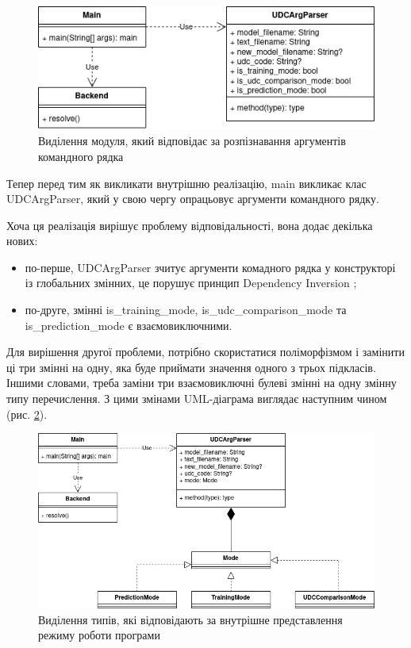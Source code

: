 \documentclass[14pt]{extarticle}
\begin{document}
  \begin{figure}[H]
    \centering
    \includegraphics{io_uml2.drawio.png}    
    \captionsetup{justification=centering}  
    \caption{Виділення модуля,
    який відповідає за розпізнавання аргументів командного рядка}
    \label{fig:io_uml2}
  \end{figure}

  Тепер перед тим як викликати внутрішню реалізацію,
  main викликає клас UDCArgParser,
  який у свою чергу опрацьовує аргументи командного рядку.
  
  Хоча ця реалізація вирішує проблему відповідальності, вона додає декілька нових:
  \begin{itemize}[labelindent=\dimexpr{}\relax, leftmargin=*]
    \item по-перше, UDCArgParser зчитує аргументи комадного рядка
    у конструкторі із глобальних змінних,
    це порушує принцип Dependency Inversion \cite{DI_wiki, SOLID_wiki};
    \item по-друге, змінні is\_training\_mode, is\_udc\_comparison\_mode та \\ is\_prediction\_mode є взаємовиключними.
  \end{itemize}

  Для вирішення другої проблеми, потрібно скористатися поліморфізмом
  \cite{Polymorphism_wiki, Subtyping_wiki, Dynamic_dispatch_wiki}
  і замінити ці три змінні на одну,
  яка буде приймати значення одного з трьох підкласів.
  Іншими словами, треба заміни три взаємовиключні булеві змінні
  на одну змінну типу перечислення.
  З цими змінами UML-діаграма виглядає наступним чином (рис. \ref{fig:io_uml3}).

  \begin{figure}[H]
    \centering
    \includegraphics[width=\textwidth]{io_uml3.drawio.png}    
    \captionsetup{justification=centering}  
    \caption{Виділення типів,
    які відповідають за внутрішне представлення режиму роботи програми}
    \label{fig:io_uml3}
  \end{figure}
  
\end{document}
